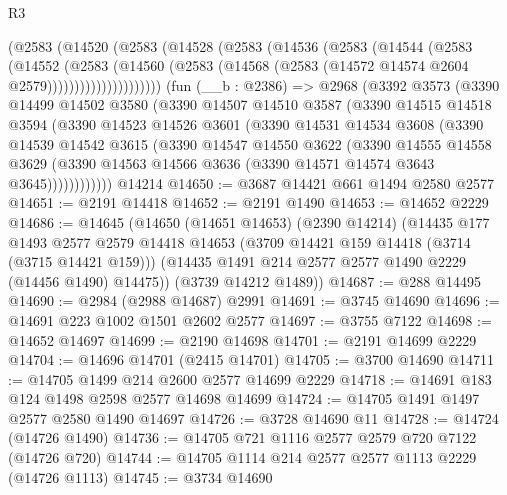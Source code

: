\begin{lexlean}{R3}
\begin{coremodule}
              (@2583
                (@14520
                  (@2583
                    (@14528
                      (@2583
                        (@14536
                          (@2583
                            (@14544
                              (@2583
                                (@14552
                                  (@2583
                                    (@14560
                                      (@2583
                                        (@14568
                                          (@2583 (@14572 @14574 @2604 @2579)))))))))))))))))))))
    (fun (__b : @2386) =>
    @2968
      (@3392
        @3573
        (@3390
          @14499
          @14502
          @3580
          (@3390
            @14507
            @14510
            @3587
            (@3390
              @14515
              @14518
              @3594
              (@3390
                @14523
                @14526
                @3601
                (@3390
                  @14531
                  @14534
                  @3608
                  (@3390
                    @14539
                    @14542
                    @3615
                    (@3390
                      @14547
                      @14550
                      @3622
                      (@3390
                        @14555
                        @14558
                        @3629
                        (@3390 @14563 @14566 @3636 (@3390 @14571 @14574 @3643 @3645))))))))))))
    @14214
@14650 := @3687 @14421 @661 @1494 @2580 @2577
@14651 := @2191 @14418
@14652 := @2191 @1490
@14653 := @14652 @2229
@14686 := @14645
    (@14650
      (@14651 @14653)
      (@2390 @14214)
      (@14435
        @177
        @1493
        @2577
        @2579
        @14418
        @14653
        (@3709 @14421 @159 @14418 (@3714 (@3715 @14421 @159)))
        (@14435 @1491 @214 @2577 @2577 @1490 @2229 (@14456 @1490) @14475))
      (@3739 @14212 @1489))
@14687 := @288 @14495
@14690 := @2984 (@2988 @14687) @2991
@14691 := @3745 @14690
@14696 := @14691 @223 @1002 @1501 @2602 @2577
@14697 := @3755 @7122
@14698 := @14652 @14697
@14699 := @2190 @14698
@14701 := @2191 @14699 @2229
@14704 := @14696 @14701 (@2415 @14701)
@14705 := @3700 @14690
@14711 := @14705 @1499 @214 @2600 @2577 @14699 @2229
@14718 := @14691 @183 @124 @1498 @2598 @2577 @14698 @14699
@14724 := @14705 @1491 @1497 @2577 @2580 @1490 @14697
@14726 := @3728 @14690 @11
@14728 := @14724 (@14726 @1490)
@14736 := @14705 @721 @1116 @2577 @2579 @720 @7122 (@14726 @720)
@14744 := @14705 @1114 @214 @2577 @2577 @1113 @2229 (@14726 @1113)
@14745 := @3734 @14690

\end{coremodule}
\end{lexlean}

